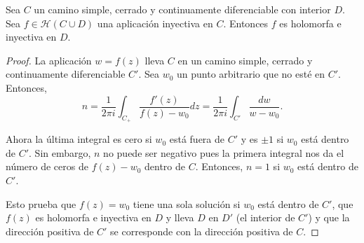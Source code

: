 \begin{theorem}
    Sea $C$ un camino simple, cerrado y continuamente diferenciable con interior $D$. Sea $f \in \mathcal{H}(C \cup D)$ una aplicación inyectiva en $C$. Entonces $f$ es holomorfa e inyectiva en $D$.
\end{theorem}

\begin{proof}
    La aplicación $w = f(z)$ lleva $C$ en un camino simple, cerrado y continuamente diferenciable $C'$. Sea $w_0$ un punto arbitrario que no esté en $C'$. Entonces,
    \begin{equation*}
        n = \dfrac{1}{2 \pi i} \int_{C_+} \dfrac{f'(z)}{f(z) - w_0} dz =  \dfrac{1}{2 \pi i} \int_{C'} \dfrac{dw}{w - w_0}.
    \end{equation*}

    Ahora la última integral es cero si $w_0$ está fuera de $C'$ y es $\pm 1$ si $w_0$ está dentro de $C'$. Sin embargo, $n$ no puede ser negativo pues la primera integral nos da el número de ceros de $f(z) - w_0$ dentro de $C$. Entonces, $n=1$ si $w_0$ está dentro de $C'$.

    Esto prueba que $f(z) = w_0$ tiene una sola solución si $w_0$ está dentro de $C'$, que $f(z)$ es holomorfa e inyectiva en $D$ y lleva $D$ en $D'$ (el interior de $C'$) y que la dirección positiva de $C'$ se corresponde con la dirección positiva de $C$.
\end{proof}

